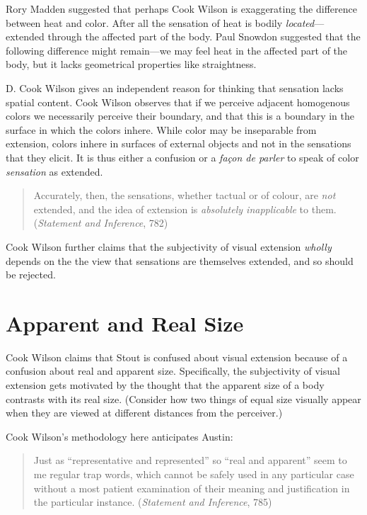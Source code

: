 \documentclass[11pt]{article}
\begin{document}
    \begin{discussion}
         Rory Madden suggested that perhaps Cook Wilson is exaggerating the difference between heat and color. After all the sensation of heat is bodily \emph{located}---extended through the affected part of the body. Paul Snowdon suggested that the following difference might remain---we may feel heat in the affected part of the body, but it lacks geometrical properties like straightness.
    \end{discussion}

D. Cook Wilson gives an independent reason for thinking that sensation lacks spatial content. Cook Wilson observes that if we perceive adjacent homogenous colors we necessarily perceive their boundary, and that this is a boundary in the surface in which the colors inhere. While color may be inseparable from extension, colors inhere in surfaces of external objects and not in the sensations that they elicit. It is thus either a confusion or a \emph{façon de parler} to speak of color \emph{sensation} as extended.
    \begin{quote}
        Accurately, then, the sensations, whether tactual or of colour, are \emph{not} extended, and the idea of extension is \emph{absolutely inapplicable} to them. (\emph{Statement and Inference}, 782)
    \end{quote}
Cook Wilson further claims that the subjectivity of visual extension \emph{wholly} depends on the the view that sensations are themselves extended, and so should be rejected.


\section{Apparent and Real Size}\label{sec:apparent_and_real_size} %

Cook Wilson claims that Stout is confused about visual extension because of a confusion about  real and apparent size. Specifically, the subjectivity of visual extension gets motivated by the thought that the apparent size of a body contrasts with its real size. (Consider how two things of equal size visually appear when they are viewed at different distances from the perceiver.) 

Cook Wilson's methodology here anticipates Austin:
    \begin{quote}
    	Just as ``representative and represented'' so ``real and apparent'' seem to me regular trap words, which cannot be safely used in any particular case without a most patient examination of their meaning and justification in the particular instance. (\emph{Statement and Inference}, 785)
    \end{quote}
\end{document}
